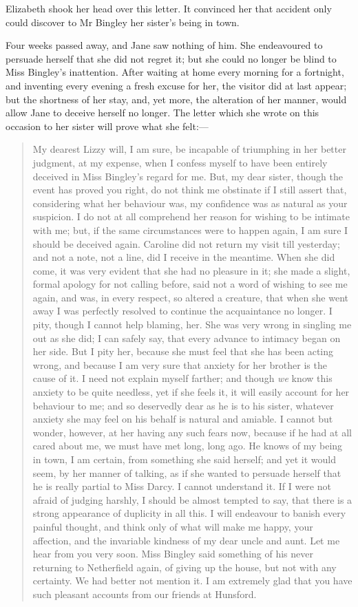 Elizabeth shook her head over this letter. It convinced her that accident only could discover to Mr Bingley her sister's being in town.

Four weeks passed away, and Jane saw nothing of him. She endeavoured to persuade herself that she did not regret it; but she could no longer be blind to Miss Bingley's inattention. After waiting at home every morning for a fortnight, and inventing every evening a fresh excuse for her, the visitor did at last appear; but the shortness of her stay, and, yet more, the alteration of her manner, would allow Jane to deceive herself no longer. The letter which she wrote on this occasion to her sister will prove what she felt:—

\begin{quotation}
My dearest Lizzy will, I am sure, be incapable of triumphing in her better judgment, at my expense, when I confess myself to have been entirely deceived in Miss Bingley's regard for me. But, my dear sister, though the event has proved you right, do not think me obstinate if I still assert that, considering what her behaviour was, my confidence was as natural as your suspicion. I do not at all comprehend her reason for wishing to be intimate with me; but, if the same circumstances were to happen again, I am sure I should be deceived again. Caroline did not return my visit till yesterday; and not a note, not a line, did I receive in the meantime. When she did come, it was very evident that she had no pleasure in it; she made a slight, formal apology for not calling before, said not a word of wishing to see me again, and was, in every respect, so altered a creature, that when she went away I was perfectly resolved to continue the acquaintance no longer. I pity, though I cannot help blaming, her. She was very wrong in singling me out as she did; I can safely say, that every advance to intimacy began on her side. But I pity her, because she must feel that she has been acting wrong, and because I am very sure that anxiety for her brother is the cause of it. I need not explain myself farther; and though \textit{we} know this anxiety to be quite needless, yet if she feels it, it will easily account for her behaviour to me; and so deservedly dear as he is to his sister, whatever anxiety she may feel on his behalf is natural and amiable. I cannot but wonder, however, at her having any such fears now, because if he had at all cared about me, we must have met long, long ago. He knows of my being in town, I am certain, from something she said herself; and yet it would seem, by her manner of talking, as if she wanted to persuade herself that he is really partial to Miss Darcy. I cannot understand it. If I were not afraid of judging harshly, I should be almost tempted to say, that there is a strong appearance of duplicity in all this. I will endeavour to banish every painful thought, and think only of what will make me happy, your affection, and the invariable kindness of my dear uncle and aunt. Let me hear from you very soon. Miss Bingley said something of his never returning to Netherfield again, of giving up the house, but not with any certainty. We had better not mention it. I am extremely glad that you have such pleasant accounts from our friends at Hunsford. 
\end{quotation}
